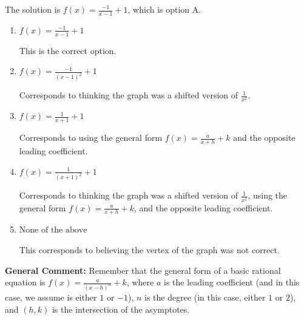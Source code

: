 \documentclass{extbook}[14pt]
\begin{document}
\begin{enumerate}
{The solution is \( f(x) = \frac{-1}{x - 1} + 1 \), which is option A.\begin{enumerate}[label=\Alph*.]
\item \( f(x) = \frac{-1}{x - 1} + 1 \)

This is the correct option.
\item \( f(x) = \frac{-1}{(x - 1)^2} + 1 \)

Corresponds to thinking the graph was a shifted version of $\frac{1}{x^2}$.
\item \( f(x) = \frac{1}{x + 1} + 1 \)

Corresponds to using the general form $f(x) = \frac{a}{x+h}+k$ and the opposite leading coefficient.
\item \( f(x) = \frac{1}{(x + 1)^2} + 1 \)

Corresponds to thinking the graph was a shifted version of $\frac{1}{x^2}$, using the general form $f(x) = \frac{a}{x+h}+k$, and the opposite leading coefficient.
\item \( \text{None of the above} \)

This corresponds to believing the vertex of the graph was not correct.
\end{enumerate}

\textbf{General Comment:} Remember that the general form of a basic rational equation is $ f(x) = \frac{a}{(x-h)^n} + k$, where $a$ is the leading coefficient (and in this case, we assume is either $1$ or $-1$), $n$ is the degree (in this case, either $1$ or $2$), and $(h, k)$ is the intersection of the asymptotes.
}
\end{enumerate}
\end{document}
